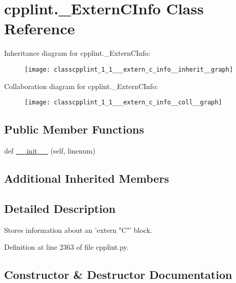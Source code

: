 \hypertarget{classcpplint_1_1___extern_c_info}{}\section{cpplint.\+\_\+\+Extern\+C\+Info Class Reference}
\label{classcpplint_1_1___extern_c_info}


Inheritance diagram for cpplint.\+\_\+\+Extern\+C\+Info\+:
\nopagebreak
\begin{figure}[H]
\begin{center}
\leavevmode
\texttt{[image: classcpplint\_1\_1\_\_\_extern\_c\_info\_\_inherit\_\_graph]}
\end{center}
\end{figure}


Collaboration diagram for cpplint.\+\_\+\+Extern\+C\+Info\+:
\nopagebreak
\begin{figure}[H]
\begin{center}
\leavevmode
\texttt{[image: classcpplint\_1\_1\_\_\_extern\_c\_info\_\_coll\_\_graph]}
\end{center}
\end{figure}
\subsection*{Public Member Functions}
\begin{DoxyCompactItemize}
\item 
def \hyperlink{classcpplint_1_1___extern_c_info_a903a8aefdb01fd5be044f920ea110d0a}{\+\_\+\+\_\+init\+\_\+\+\_\+} (self, linenum)
\end{DoxyCompactItemize}
\subsection*{Additional Inherited Members}


\subsection{Detailed Description}
\begin{DoxyVerb}Stores information about an 'extern "C"' block.\end{DoxyVerb}
 

Definition at line 2363 of file cpplint.\+py.



\subsection{Constructor \& Destructor Documentation}
